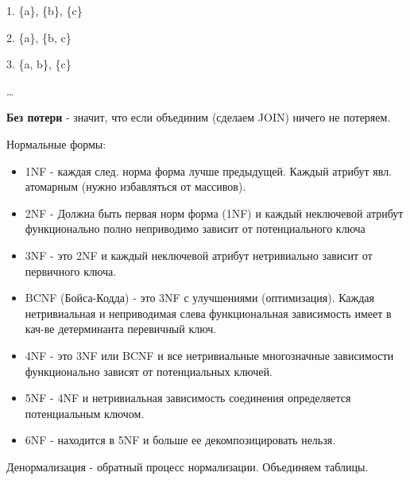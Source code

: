 1. \{a\},  \{b\},  \{c\}

2.  \{a\},  \{b, c\}

3.  \{a, b\},  \{c\}

\dots

\textbf{Без потери} - значит, что если объединим (сделаем JOIN) ничего не потеряем.

Нормальные формы:

\begin{itemize}
	\item 1NF - каждая след. норма форма лучше предыдущей. Каждый атрибут явл.
	      атомарным (нужно избавляться от массивов).
	\item 2NF - Должна быть первая норм форма (1NF)
	      и каждый неключевой атрибут функционально полно неприводимо зависит от потенциального ключа
	\item 3NF - это 2NF и каждый неключевой атрибут нетривиально зависит от первичного ключа.
	\item BCNF (Бойса-Кодда) - это 3NF с улучшениями (оптимизация).
	      Каждая нетривиальная и неприводимая слева функциональная зависимость
	      имеет в кач-ве детерминанта перевичный ключ.
	\item 4NF - это 3NF или BCNF и все нетривиальные многозначные зависимости функционально
	      зависят от  потенциальных ключей.
	\item 5NF - 4NF и нетривиальная зависимость соединения определяется потенциальным ключом.
	\item 6NF - находится в 5NF и больше ее декомпозицировать нельзя.
\end{itemize}

Денормализация - обратный процесс нормализации. Объединяем таблицы.